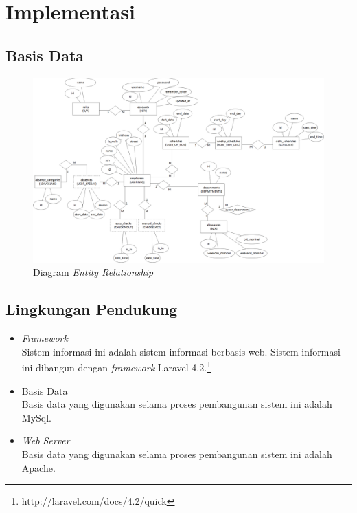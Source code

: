\section{Implementasi}

\subsection{Basis Data}
\begin{figure}[H]
	\centering
		\includegraphics[width=1.00\textwidth]{gambar/erd.png}
	\caption{Diagram \textit{Entity Relationship}}
	\label{fig:erd}
\end{figure}

\subsection{Lingkungan Pendukung}
\begin{itemize}
	\item \textit{Framework}
\\Sistem informasi ini adalah sistem informasi berbasis web. Sistem informasi ini dibangun dengan \textit{framework} Laravel 4.2.\footnote{http://laravel.com/docs/4.2/quick} 
	\item Basis Data
\\Basis data yang digunakan selama proses pembangunan sistem ini adalah MySql. 
	\item \textit{Web Server} 
\\Basis data yang digunakan selama proses pembangunan sistem ini adalah Apache.
\end{itemize}

\pagebreak



